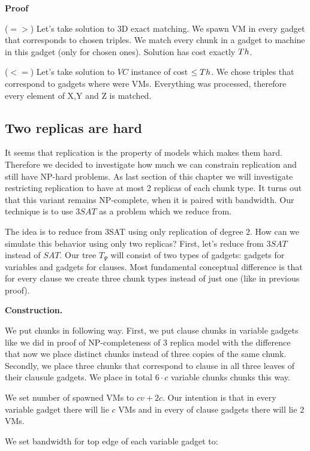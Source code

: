 \textbf{Proof}

($=>$) Let's take solution to 3D exact matching. We spawn VM in every
gadget that corresponds to chosen triples. We match every chunk in a
gadget to machine in this gadget (only for chosen ones). Solution has
cost exactly $Th$.

($<=$) Let's take solution to $VC$ instance of cost $\leq Th$. We
chose triples that correspond to gadgets where were VMs. Everything
was processed, therefore every element of X,Y and Z is matched.


\subsection{Two replicas are hard}\label{ssec:two}

It seems that replication is the property of models which makes them
hard. Therefore we decided to investigate how much we can constrain
replication and still have NP-hard problems. As last section of this
chapter we will investigate restricting replication to have at most 2
replicas of each chunk type. It turns out that this variant remains
NP-complete, when it is paired with bandwidth. Our technique is to use
$3SAT$ as a problem which we reduce from.


The idea is to reduce from 3SAT using only replication of degree
$2$. How can we simulate this behavior using only two replicas? First,
let's reduce from $3SAT$ instead of $SAT$. Our tree $T_{\Psi}$
will consist of two types of gadgets: gadgets for variables and
gadgets for clauses. Most fundamental conceptual difference is that
for every clause we create three chunk types instead of just one (like
in previous proof).

\textbf{Construction.}

We put chunks in following way. First, we put clause chunks in
variable gadgets like we did in proof of NP-completeness of 3 replica
model with the difference that now we place distinct chunks instead of
three copies of the same chunk.  Secondly, we place three chunks that
correspond to clause in all three leaves of their clausule gadgets. We
place in total $6 \cdot c$ variable chunks chunks this way.

We set number of spawned VMs to $cv + 2c$. Our intention is that in
every variable gadget there will lie $c$ VMs and in every of clause
gadgets there will lie $2$ VMs.

We set bandwidth for top edge of each variable gadget to:

